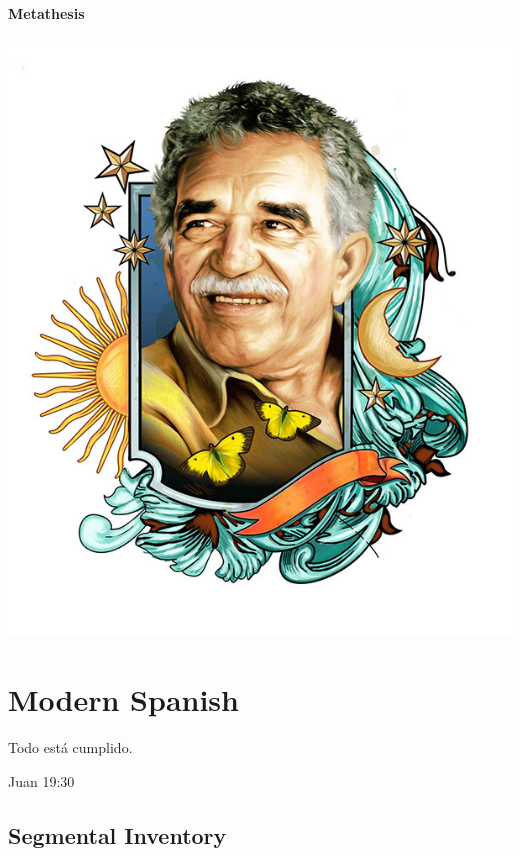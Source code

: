 \documentclass{report}[12pt]
\begin{document}
\subsubsection{Metathesis}

\begin{tcolorbox}

\end{tcolorbox}

\pagebreak

\includegraphics[scale=0.75]{marquez.jpg}

\thispagestyle{empty}

\pagebreak

\chapter{Modern Spanish}

\epigraph{Todo está cumplido.}{Juan 19:30}

\section{Segmental Inventory}
\end{document}

